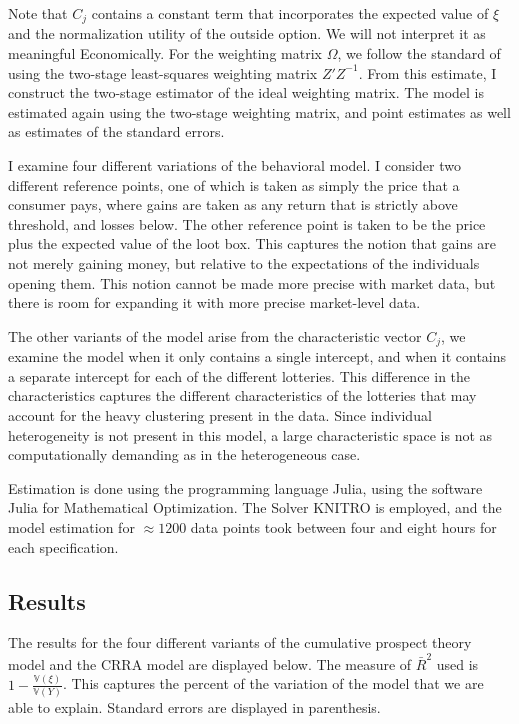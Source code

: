 \documentclass[12pt]{paper}
\newcommand{\inv}[1]{{#1}^{-1}}
\begin{document}
Note that $C_j$ contains a constant term that incorporates the
expected value of $\xi$ and the normalization utility of the outside
option. We will not interpret it as meaningful Economically. For the
weighting matrix $\Omega$, we follow the standard of using the two-stage
least-squares weighting matrix $\inv{Z'Z}$. From this estimate, I
construct the two-stage estimator of the ideal weighting matrix. The
model is estimated again using the two-stage weighting matrix, and
point estimates as well as estimates of the standard errors. 

I examine four different variations of the behavioral model. I
consider two different reference points, one of which is taken as
simply the price that a consumer pays, where gains are taken as
any return that is strictly above threshold, and losses below. The
other reference point is taken to be the price plus the expected value
of the loot box. This captures the notion that gains are not merely
gaining money, but relative to the expectations of the individuals
opening them. This notion cannot be made more precise with market
data, but there is room for expanding it with more precise
market-level data.

The other variants of the model arise from the characteristic vector
$C_j$, we examine the model when it only contains a single intercept,
and when it contains a separate intercept for each of the different
lotteries. This difference in the characteristics captures the
different characteristics of the lotteries that may account for the
heavy clustering present in the data. Since individual heterogeneity
is not present in this model, a large characteristic space is not as
computationally demanding as in the heterogeneous case.

Estimation is done using the programming language Julia, using the
software Julia for Mathematical Optimization. The Solver KNITRO is
employed, and the model estimation for $\approx 1200$ data points took
between four and eight hours for each specification. 


\subsection{Results}
The results for the four different variants of the cumulative prospect
theory model and the CRRA model are displayed below. The measure of
$\bar{R}^2$ used is $1 - \frac{\mathbb{V}(\xi)}{\mathbb{V}(Y)}$. This
captures the percent of the variation of the model that we are able to
explain. Standard errors are displayed in parenthesis.
\end{document}
